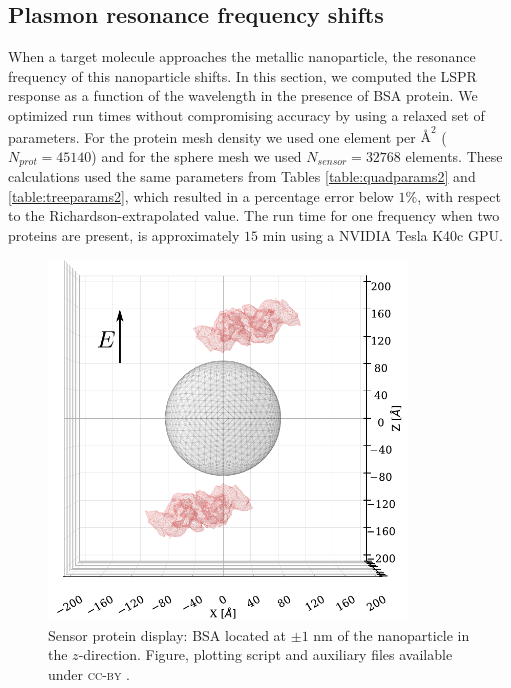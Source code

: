 \subsection{Plasmon resonance frequency shifts} \label{sec:shift_bsa}

When a target molecule approaches the metallic nanoparticle, the resonance frequency
of this nanoparticle shifts. In this section, we computed the LSPR response as a
function of the wavelength in the presence of BSA protein. We optimized run times 
without compromising accuracy by using a relaxed set of parameters. For the protein
mesh density we used one element per $\text{\AA}^2$ ($N_{prot} = 45140$) and for the
sphere mesh we used $N_{sensor} = 32768$ elements. These calculations used the same
parameters from Tables \ref{table:quadparams2} and \ref{table:treeparams2}, which 
resulted in a percentage error below $1\%$, with respect to the Richardson-extrapolated
value. The run time for one frequency when two proteins are present, is approximately 
$15$ min using a NVIDIA Tesla K40c GPU.



\begin{center}
    \begin{figure} %
       \centering
       \includegraphics[width=0.85\textwidth]{2prot_1nm_z_R8nm.pdf} 
       \caption{Sensor protein display: BSA located at $\pm 1$ nm of the 
                nanoparticle in the $z$-direction. Figure, plotting script and auxiliary 
                files available under \textsc{cc-by} \cite{ClementiETal2018e}.}
       \label{fig:display_z}
    \end{figure}
    \end{center}

